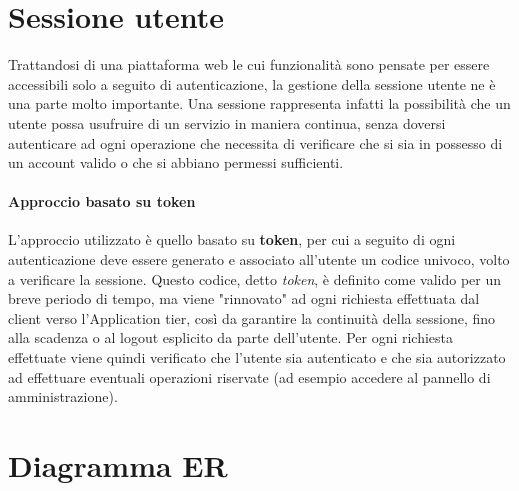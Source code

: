 \section{Sessione utente}
Trattandosi di una piattaforma web le cui funzionalità sono pensate per essere
accessibili solo a seguito di autenticazione, la gestione della sessione utente
ne è una parte molto importante. Una sessione rappresenta infatti la possibilità
che un utente possa usufruire di un servizio in maniera continua, senza doversi
autenticare ad ogni operazione che necessita di verificare che si sia in possesso
di un account valido o che si abbiano permessi sufficienti.

\paragraph{Approccio basato su token}
L'approccio utilizzato è quello basato su \textbf{token}, per cui a seguito
di ogni autenticazione deve essere generato e associato all'utente un codice
univoco, volto a verificare la sessione. Questo codice, detto \textit{token}, è
definito come valido per un breve periodo di tempo, ma viene "rinnovato" ad ogni
richiesta effettuata dal client verso l'Application tier, così da garantire la
continuità della sessione, fino alla scadenza o al logout esplicito da parte
dell'utente.
Per ogni richiesta effettuate viene quindi verificato che l'utente sia autenticato
e che sia autorizzato ad effettuare eventuali operazioni riservate (ad esempio
accedere al pannello di amministrazione).


\section{Diagramma ER}

